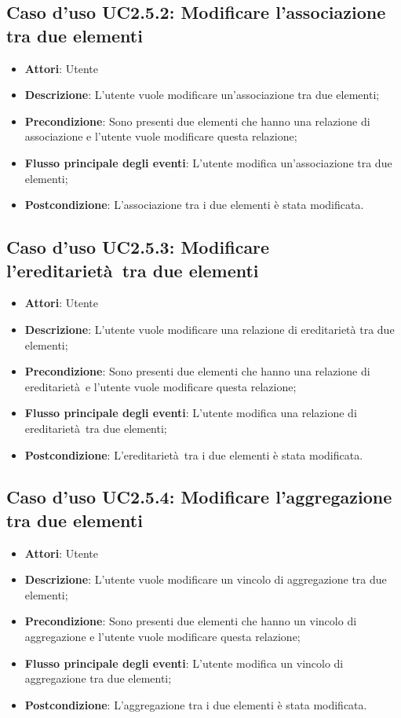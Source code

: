 \documentclass[../AnalisiDeiRequisiti.tex]{subfiles}
\begin{document}
		\subsection{Caso d'uso UC2.5.2: Modificare l'associazione tra due elementi}
		\begin{itemize}
			\item \textbf{Attori}: Utente
			\item \textbf{Descrizione}: L'utente vuole modificare un'associazione tra due elementi;
			\item \textbf{Precondizione}: Sono presenti due elementi che hanno una relazione di associazione e l'utente vuole modificare questa relazione;
			\item \textbf{Flusso principale degli eventi}: L'utente modifica un'associazione tra due elementi;
			\item \textbf{Postcondizione}: L'associazione tra i due elementi è stata modificata.
		\end{itemize}
		\subsection{Caso d'uso UC2.5.3: Modificare l'ereditarietà tra due elementi}
		\begin{itemize}
			\item \textbf{Attori}: Utente
			\item \textbf{Descrizione}: L'utente vuole modificare una relazione di ereditarietà tra due elementi;
			\item \textbf{Precondizione}: Sono presenti due elementi che hanno una relazione di ereditarietà e l'utente vuole modificare questa relazione;
			\item \textbf{Flusso principale degli eventi}: L'utente modifica una relazione di ereditarietà tra due elementi;
			\item \textbf{Postcondizione}: L'ereditarietà tra i due elementi è stata modificata.
		\end{itemize}
		\subsection{Caso d'uso UC2.5.4: Modificare l'aggregazione tra due elementi}
		\begin{itemize}
			\item \textbf{Attori}: Utente
			\item \textbf{Descrizione}: L'utente vuole modificare un vincolo di aggregazione tra due elementi;
			\item \textbf{Precondizione}: Sono presenti due elementi che hanno un vincolo di aggregazione e l'utente vuole modificare questa relazione;
			\item \textbf{Flusso principale degli eventi}: L'utente modifica un vincolo di aggregazione tra due elementi;
			\item \textbf{Postcondizione}: L'aggregazione tra i due elementi è stata modificata.
		\end{itemize}
\end{document}
